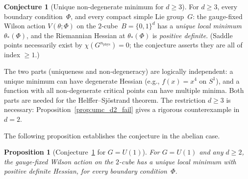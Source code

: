 \documentclass[11pt,a4paper]{article}
\theoremstyle{plain}
\newtheorem{proposition}[theorem]{Proposition}
\theoremstyle{definition}
\newtheorem{conjecture}[theorem]{Conjecture}
\theoremstyle{remark}
\begin{document}
\begin{conjecture}[Unique non-degenerate minimum for $d \geq 3$]
\label{conj:unique_min}
For $d \geq 3$, every boundary condition~$\Phi$, and every
compact simple Lie group~$G$: the gauge-fixed Wilson action
$V(\theta;\Phi)$ on the $2$-cube~$B = \{0,1\}^d$ has
a \emph{unique local minimum} $\theta_*(\Phi)$, and the
Riemannian Hessian at $\theta_*(\Phi)$ is
\emph{positive definite}.
\textup{(}Saddle points necessarily exist by
$\chi(G^{n_{\mathrm{phys}}}) = 0$; the conjecture
asserts they are all of index $\geq 1$.\textup{)}
\end{conjecture}

\noindent
The two parts (uniqueness and non-degeneracy) are logically
independent: a unique minimum can have degenerate Hessian
(e.g., $f(x) = x^4$ on $S^1$), and a function with all
non-degenerate critical points can have multiple minima.
Both parts are needed for the Helffer--Sj\"ostrand theorem.
The restriction $d \geq 3$ is necessary:
Proposition~\ref{prop:umc_d2_fail} gives a rigorous
counterexample in $d = 2$.

The following proposition establishes the conjecture
in the abelian case.

\begin{proposition}[Conjecture~\ref{conj:unique_min}
for $G = U(1)$]
\label{prop:unique_abelian}
For $G = U(1)$ and any $d \geq 2$, the gauge-fixed
Wilson action on the $2$-cube has a unique local
minimum with positive definite Hessian, for every
boundary condition~$\Phi$.
\end{proposition}
\end{document}

